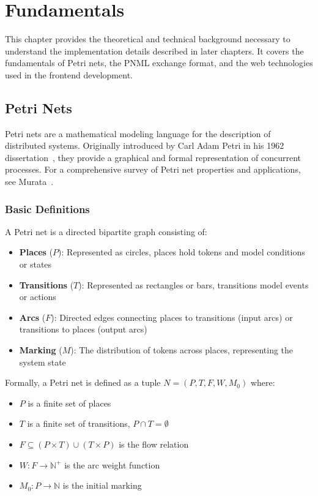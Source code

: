 \chapter{Fundamentals}
\label{chap:fundamentals}

This chapter provides the theoretical and technical background necessary to understand the implementation details described in later chapters. It covers the fundamentals of Petri nets, the PNML exchange format, and the web technologies used in the frontend development.

\section{Petri Nets}
\label{sec:petri-nets}

Petri nets are a mathematical modeling language for the description of distributed systems. Originally introduced by Carl Adam Petri in his 1962 dissertation~\cite{Petri1962}, they provide a graphical and formal representation of concurrent processes. For a comprehensive survey of Petri net properties and applications, see Murata~\cite{Murata1989}.

\subsection{Basic Definitions}

A Petri net is a directed bipartite graph consisting of:

\begin{itemize}
    \item \textbf{Places} ($P$): Represented as circles, places hold tokens and model conditions or states
    \item \textbf{Transitions} ($T$): Represented as rectangles or bars, transitions model events or actions
    \item \textbf{Arcs} ($F$): Directed edges connecting places to transitions (input arcs) or transitions to places (output arcs)
    \item \textbf{Marking} ($M$): The distribution of tokens across places, representing the system state
\end{itemize}

Formally, a Petri net is defined as a tuple $N = (P, T, F, W, M_0)$ where:
\begin{itemize}
    \item $P$ is a finite set of places
    \item $T$ is a finite set of transitions, $P \cap T = \emptyset$
    \item $F \subseteq (P \times T) \cup (T \times P)$ is the flow relation
    \item $W: F \rightarrow \mathbb{N}^+$ is the arc weight function
    \item $M_0: P \rightarrow \mathbb{N}$ is the initial marking
\end{itemize}

